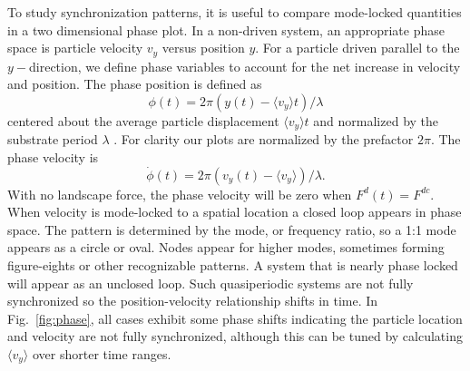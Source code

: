 \documentclass[twocolumn,preprintnumbers,amsmath,amssymb,aps,prx]{revtex4}
\begin{document}
  To study synchronization patterns, 
  it is useful to compare
  mode-locked quantities %
  in a two dimensional phase plot. 
  In a non-driven system, an appropriate
  phase space is particle velocity $v_y$ versus position $y$.  
  For a particle driven parallel to the $y-$direction,
  we define phase variables 
  to account for the net increase in velocity
  and position.
  The phase position is
  defined as 
  \begin{equation}
    \phi(t) = 2\pi (y(t)-\langle v_y \rangle t)/\lambda
  \end{equation}
  centered about the average particle displacement $\langle v_y \rangle t$
  and normalized by the substrate period $\lambda$ \cite{Juniper2015}.
  For clarity our plots are normalized by the prefactor $2\pi$. 
  The phase velocity is
  \begin{equation}
    \dot{\phi}(t) =2\pi (v_y(t)-\langle v_y \rangle) /\lambda.  %
  \end{equation}
  With no landscape force, 
  the phase velocity will be zero when $F^d(t) = F^{dc}$.
  When velocity
  is mode-locked to %
  a spatial location
  a closed loop appears in  
  phase space. %
  The pattern is determined by the mode,
  or frequency ratio,
  so a 1:1 mode appears as a circle or oval. 
  Nodes appear %
  for higher modes,
  sometimes forming figure-eights
  or other recognizable patterns.
  A system that is nearly phase locked
  will appear as an unclosed loop.
  Such quasiperiodic systems are
  not fully synchronized
  so the position-velocity relationship
  shifts in time.
  In Fig.~\ref{fig:phase}, 
  all cases exhibit some phase shifts %
  indicating the particle location and velocity
  are not fully synchronized,
  although this can be tuned by
  calculating $\langle v_y \rangle$ over
  shorter time ranges.
  
\end{document}
